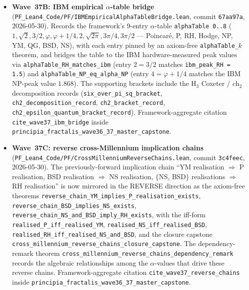 \begin{remark}
\begin{itemize}
  \item \textbf{Wave~37B: IBM empirical $\alpha$-table bridge} (\texttt{PF\_Lean4\_Code/PF/IBMEmpiricalAlphaTableBridge.lean}, commit \texttt{67aa97a}, 2026-05-30). Records the framework's 9-entry $\alpha$-table \texttt{alphaTable~0..8} ($1, \sqrt{2}, 3/2, \varphi, \varphi + 1/4, 2, \sqrt{2\pi}, 3\pi/4, 3\pi/2$ — Poincaré, P, RH, Hodge, NP, YM, QG, BSD, NS), with each entry pinned by an axiom-free \texttt{alphaTable\_$k$} theorem, and bridges the table to the IBM hardware-measured peak values via \texttt{alphaTable\_RH\_matches\_ibm} (entry $2 = 3/2$ matches \texttt{ibm\_peak\_RH = 1.5}) and \texttt{alphaTable\_NP\_eq\_alpha\_NP} (entry $4 = \varphi + 1/4$ matches the IBM NP-peak value $1.868$). The supporting brackets include the H$_3$ Coxeter / $\mathrm{ch}_2$ decomposition records (\texttt{six\_over\_pi\_sq\_bracket}, \texttt{ch2\_decomposition\_record}, \texttt{ch2\_bracket\_record}, \texttt{ch2\_epsilon\_quantum\_bracket\_record}). Framework-aggregate citation \texttt{cite\_wave37\_ibm\_bridge} inside \texttt{principia\_fractalis\_wave36\_37\_master\_capstone}.
  \item \textbf{Wave~37C: reverse cross-Millennium implication chains} (\texttt{PF\_Lean4\_Code/PF/CrossMillenniumReverseChains.lean}, commit \texttt{3c4feec}, 2026-05-30). The previously-forward implication chain ``YM realisation $\Rightarrow$ P realisation, BSD realisation $\Rightarrow$ NS realisation, $\{$NS, BSD$\}$ realisations $\Rightarrow$ RH realisation'' is now mirrored in the REVERSE direction as the axiom-free theorems \texttt{reverse\_chain\_YM\_implies\_P\_realisation\_exists}, \texttt{reverse\_chain\_BSD\_implies\_NS\_exists}, \texttt{reverse\_chain\_NS\_and\_BSD\_imply\_RH\_exists}, with the iff-form \texttt{realised\_P\_iff\_realised\_YM}, \texttt{realised\_NS\_iff\_realised\_BSD}, \texttt{realised\_RH\_iff\_realised\_NS\_and\_BSD}, and the closure capstone \texttt{cross\_millennium\_reverse\_chains\_closure\_capstone}. The dependency-remark theorem \texttt{cross\_millennium\_reverse\_chains\_dependency\_remark} records the algebraic relationships among the $\alpha$-values that drive these reverse chains. Framework-aggregate citation \texttt{cite\_wave37\_reverse\_chains} inside \texttt{principia\_fractalis\_wave36\_37\_master\_capstone}.
\end{itemize}


\end{remark}
